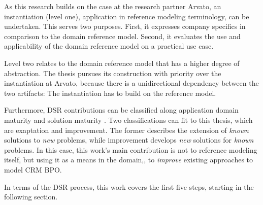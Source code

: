 As this research builds on the case at the research partner Arvato, an instantiation (level one), \viz application in reference modeling terminology, can be undertaken. This serves two purposes. First, it expresses company specifics in comparison to the domain reference model. Second, it evaluates the use and applicability of the domain reference model on a practical use case.  

Level two relates to the domain reference model that has a higher degree of abstraction. The thesis pursues its construction with priority over the instantiation at Arvato, because there is a unidirectional dependency between the two artifacts: The instantiation has to build on the reference model. 

Furthermore, \acrshort{DSR} contributions can be classified along application domain maturity and solution maturity \citep{gregor2013positioning}. Two classifications can fit to this thesis, which are exaptation and improvement. The former describes the extension of \textit{known} solutions to \textit{new} problems, while improvement develops \textit{new} solutions for \textit{known} problems. In this case, this work's main contribution is not to reference modeling itself, but using it as a means in the domain,\eg, to \textit{improve} existing approaches to model CRM BPO. 

In terms of the \acrshort{DSR} process, this work covers the first five steps, starting in the following section. 



